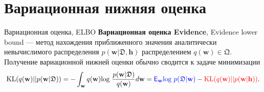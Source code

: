 \documentclass[usenames,dvipsnames,10pt,pdf,utf8,russian,aspectratio=43]{beamer}
\begin{document}
\section{Вариационная нижняя оценка}
\begin{frame}{Вариационная оценка, ELBO}
\textbf{Вариационная оценка Evidence}, Evidence lower bound --- метод нахождения приближенного значения аналитически невычислимого распределения $p(\mathbf{w}|\mathfrak{D}, \mathbf{h})$ распределением $q(\mathbf{w}) \in \mathfrak{Q}$. Получение вариационной нижней оценки обычно сводится к задаче минимизации
$$\text{KL}(q(\mathbf{w})||p(\mathbf{w}| \mathfrak{D}))=
-\int_{\mathbf{w}} q(\mathbf{w}) \text{log}~\frac{p(\mathbf{w}| \mathfrak{D})} {q(\mathbf{w})}d\mathbf{w} = \textcolor{blue}{\mathsf{E}_{\mathbf{w}} \text{log}~p(\mathfrak{D}|\mathbf{w})} - \textcolor{red}{\text{KL}(q(\mathbf{w})||p(\mathbf{w}| \mathbf{h}))}.
$$

\begin{figure}
  \centering
\label{fig:1}\qquad

\end{figure}

\end{frame}
\end{document}
